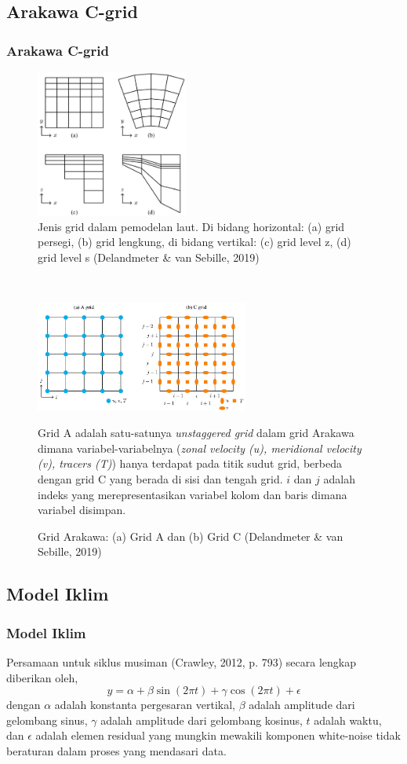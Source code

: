 \documentclass{beamer}
\begin{document}
\subsection{Arakawa C-grid}
\begin{frame}[allowframebreaks]
	\frametitle{Arakawa C-grid}	

	\begin{figure}[H]
	\centering
	\includegraphics[width=5cm]{grid.jpg}
	\caption{Jenis grid dalam pemodelan laut. Di bidang horizontal: (a) grid persegi, (b) grid lengkung, di bidang vertikal: (c) grid level z, (d) grid level s (Delandmeter \& van Sebille, 2019)}
	\label{fig:grid}
	\end{figure}
	$\;$ \\
	\begin{figure}[H]
		\centering
		\includegraphics[width=7cm]{arakawa.jpg}
		\caption{Grid Arakawa: (a) Grid A dan (b) Grid C (Delandmeter \& van Sebille, 2019)}
			\label{fig:arakawa}
			\tiny
			Grid A adalah satu-satunya \textit{unstaggered grid} dalam grid Arakawa dimana variabel-variabelnya (\textit{zonal velocity (u), meridional velocity (v), tracers (T)}) hanya terdapat pada titik sudut grid, berbeda dengan grid C yang berada di sisi dan tengah grid. $i$ dan $j$ adalah indeks yang merepresentasikan variabel kolom dan baris dimana variabel disimpan.
	\end{figure}	
\end{frame}

\subsection{Model Iklim}
\begin{frame}[allowframebreaks]
	\frametitle{Model Iklim}
	Persamaan untuk siklus musiman (Crawley, 2012, p. 793) secara lengkap diberikan oleh,
	\begin{equation}\label{eq:sm}
		y = \alpha + \beta \sin(2\pi t)+\gamma \cos(2\pi t) + \epsilon
	\end{equation}
	dengan $\alpha$ adalah konstanta pergesaran vertikal, $\beta$ adalah amplitude dari gelombang sinus, $\gamma$ adalah amplitude dari gelombang kosinus, $t$ adalah waktu, dan $\epsilon$ adalah elemen residual yang mungkin mewakili komponen white-noise tidak beraturan dalam proses yang mendasari data.	
\end{frame}
\end{document}
